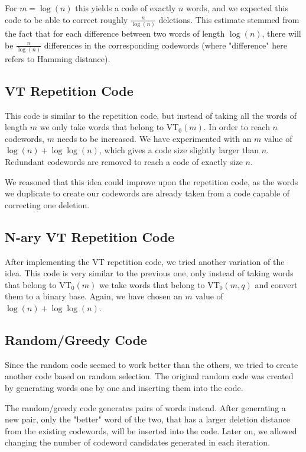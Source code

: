 \documentclass{article}
\begin{document}
For $m = \log(n)$ this yields a code of exactly $n$ words, and we expected this code to be able to correct roughly $\frac{n}{\log(n)}$ deletions. This estimate stemmed from the fact that for each difference between two words of length $\log(n)$, there will be $\frac{n}{\log(n)}$ differences in the corresponding codewords (where "difference" here refers to Hamming distance).

\subsection{VT Repetition Code}

This code is similar to the repetition code, but instead of taking all the words of length $m$ we only take words that belong to VT$_0(m)$. In order to reach $n$ codewords, $m$ needs to be increased. We have experimented with an $m$ value of $\log(n) + \log\log(n)$, which gives a code size slightly larger than $n$. Redundant codewords are removed to reach a code of exactly size $n$.

We reasoned that this idea could improve upon the repetition code, as the words we duplicate to create our codewords are already taken from a code capable of correcting one deletion.

\subsection{N-ary VT Repetition Code}

After implementing the VT repetition code, we tried another variation of the idea.
This code is very similar to the previous one, only instead of taking words that belong to VT$_0(m)$ we take words that belong to VT$_0(m, q)$ and convert them to a binary base. Again, we have chosen an $m$ value of $\log(n) + \log\log(n)$.

\subsection{Random/Greedy Code}

Since the random code seemed to work better than the others, we tried to create another code based on random selection. The original random code was created by generating words one by one and inserting them into the code.

The random/greedy code generates pairs of words instead. After generating a new pair, only the "better" word of the two, that has a larger deletion distance from the existing codewords, will be inserted into the code. Later on, we allowed changing the number of codeword candidates generated in each iteration.
\end{document}
